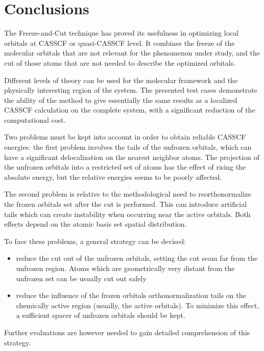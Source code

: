 \section{Conclusions}

The Freeze-and-Cut technique has proved its usefulness in optimizing local
orbitals at CASSCF or quasi-CASSCF level. It combines the freeze of the
molecular orbitals that are not relevant for the phenomenon under study, and
the cut of those atoms that are not needed to describe the optimized
orbitals.

Different levels of theory can be used for the molecular framework and the
physically interesting region of the system.  The presented test cases
demonstrate the ability of the method to give essentially the same results
as a localized CASSCF calculation on the complete system, with a
significant reduction of the computational cost.

Two problems must be kept into account in order to obtain reliable CASSCF
energies: the first problem involves the tails of the unfrozen orbitals,
which can have a significant delocalization on the nearest neighbor atoms.
The projection of the unfrozen orbitals into a restricted set of atoms has
the effect of rising the absolute energy, but the relative energies seems to
be poorly affected. 

The second problem is relative to the methodological need to reorthonormalize
the frozen orbitals set after the cut is performed. This can introduce artificial
tails which can create instability when occurring near the active
orbitals. Both effects depend on the atomic basis set spatial distribution.

To face these problems, a general strategy can be devised:
\begin{itemize}
\item reduce the cut out of the unfrozen orbitals, setting the cut seam
far from the unfrozen region. Atoms which are geometrically very distant
from the unfrozen set can be usually cut out safely
\item reduce the influence of the frozen orbitals orthonormalization tails 
on the chemically active region (usually, the active orbitals).  To minimize
this effect, a sufficient spacer of unfrozen orbitals should be kept.
\end{itemize}
Further evaluations are however needed to gain detailed comprehension of
this strategy.
